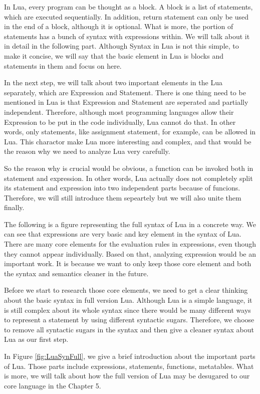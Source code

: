 \documentclass{article}
\begin{document}
In Lua, every program can be thought as a block. A block is a list of statements, which are executed sequentially. In addition, return statement can only be used in the end of a block, although it is optional. What is more, the portion of statements has a bunch of syntax with expressions within. We will talk about it in detail in the following part. Although Syntax in Lua is not this simple, to make it concise, we will say that the basic element in Lua is blocks and statements in them and focus on here.

In the next step, we will talk about two important elements in the Lua separately, which are Expression and Statement. There is one thing need to be mentioned in Lua is that Expression and Statement are seperated and partially independent. Therefore, although most programming languages allow their Expression to be put in the code individually, Lua cannot do that. In other words, only statements, like assignment statement, for example, can be allowed in Lua. This charactor make Lua more interesting and complex, and that would be the reason why we need to analyze Lua very carefully.

So the reason why is crucial would be obvious, a function can be invoked both in statement and expression. In other words, Lua actually does not completely split its statement and expression into two independent parts because of funcions. Therefore, we will still introduce them sepeartely but we will also unite them finally.

The following is a figure representing the full syntax of Lua in a concrete way. We can see that expressions are very basic and key element in the syntax of Lua. There are many core elements for the evaluation rules in expressions, even though they cannot appear individually. Based on that, analyzing expression would be an important work. It is because we want to only keep those core element and both the syntax and semantics cleaner in the future.

Before we start to research those core elements, we need to get a clear thinking about the basic syntax in full version Lua. Although Lua is a simple language, it is still complex about its whole syntax since there would be many different ways to represent a statement by using different syntactic sugars. Therefore, we choose to remove all syntactic sugars in the syntax and then give a cleaner syntax about Lua as our first step.

In Figure \ref{fig:LuaSynFull}, we give a brief introduction about the important parts of Lua. Those parts include expressions, statements, functions, metatables. What is more, we will talk about how the full version of Lua may be desugared to our core language in the Chapter 5.
\end{document}
